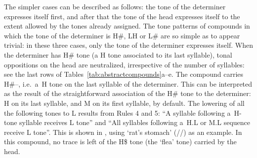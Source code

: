 The simpler cases can be described as follows: the tone of the determiner expresses itself first, and after that the tone of the head expresses itself to the extent allowed by the tones already assigned. The tone patterns of compounds in which the tone of the determiner is H\#, LH or L\# are so simple as to appear trivial: in these three cases, only the tone of the determiner expresses itself. When the determiner has H\# tone (a H tone associated to its last syllable), tonal oppositions on the head are
neutralized, irrespective of the number of syllables: see the last rows of Tables~\ref{tab:abstractcompounds}a--e. The compound
carries H\#--, i.e.\ a~H tone on the last syllable of the determiner. This can be interpreted as the
result of the straightforward association of the H\# tone to the determiner: H on its last syllable,
and M on its first syllable, by default. The lowering of all the following tones to L results from
Rules 4 and 5: “A syllable following a~H-tone syllable receives L tone” and “All syllables
following a~H.L or M.L sequence receive L tone”. This is shown in , using ‘rat's stomach' (//) as an example. In this compound, no trace is left of the H\$ tone (the ‘flea' tone) carried by the head.

